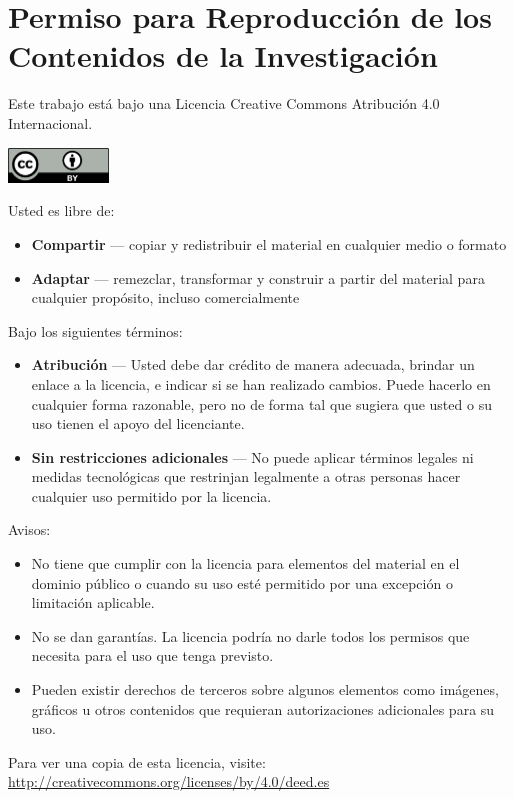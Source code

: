 \chapter*{Permiso para Reproducción de los Contenidos de la Investigación}
Este trabajo está bajo una Licencia Creative Commons Atribución 4.0 Internacional.

\begin{center}
\includegraphics[width=0.2\textwidth]{images/cc-by.png}
\end{center}

Usted es libre de:
\begin{itemize}
    \item \textbf{Compartir} — copiar y redistribuir el material en cualquier medio o formato
    \item \textbf{Adaptar} — remezclar, transformar y construir a partir del material para cualquier propósito, incluso comercialmente
\end{itemize}

Bajo los siguientes términos:
\begin{itemize}
    \item \textbf{Atribución} — Usted debe dar crédito de manera adecuada, brindar un enlace a la licencia, e indicar si se han realizado cambios. Puede hacerlo en cualquier forma razonable, pero no de forma tal que sugiera que usted o su uso tienen el apoyo del licenciante.
    \item \textbf{Sin restricciones adicionales} — No puede aplicar términos legales ni medidas tecnológicas que restrinjan legalmente a otras personas hacer cualquier uso permitido por la licencia.
\end{itemize}

Avisos:
\begin{itemize}
    \item No tiene que cumplir con la licencia para elementos del material en el dominio público o cuando su uso esté permitido por una excepción o limitación aplicable.
    \item No se dan garantías. La licencia podría no darle todos los permisos que necesita para el uso que tenga previsto.
    \item Pueden existir derechos de terceros sobre algunos elementos como imágenes, gráficos u otros contenidos que requieran autorizaciones adicionales para su uso.
\end{itemize}

Para ver una copia de esta licencia, visite:\\ 
\url{http://creativecommons.org/licenses/by/4.0/deed.es}

